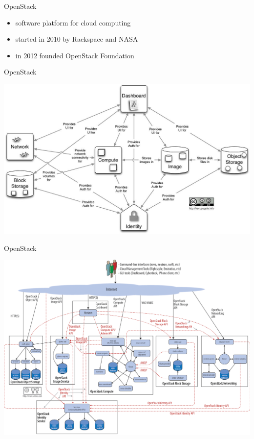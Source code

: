 \documentclass[presentation]{beamer}
\begin{document}
\begin{frame}[label={sec:orgccd6ca5}]{OpenStack}
\begin{itemize}
\item software platform for cloud computing
\item started in 2010 by Rackspace and NASA
\item in 2012 founded OpenStack Foundation
\end{itemize}
\end{frame}
\begin{frame}[label={sec:orgd42efb4}]{OpenStack}
\begin{center}
\includegraphics[width=.9\linewidth]{./openstack.jpg}
\end{center}
\end{frame}
\begin{frame}[label={sec:org04e2435}]{OpenStack}
\begin{center}
\includegraphics[width=.9\linewidth]{./openstack-detailed.png}
\end{center}
\end{frame}
\end{document}
